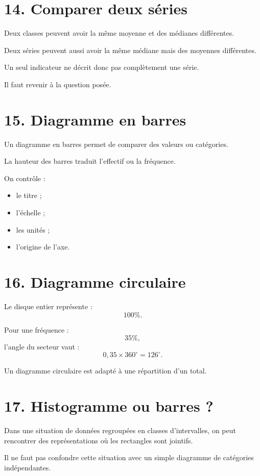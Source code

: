 \section{14. Comparer deux séries}

Deux classes peuvent avoir la même moyenne et des médianes différentes.

Deux séries peuvent aussi avoir la même médiane mais des moyennes différentes.

Un seul indicateur ne décrit donc pas complètement une série.

Il faut revenir à la question posée.

\section{15. Diagramme en barres}

Un diagramme en barres permet de comparer des valeurs ou catégories.

La hauteur des barres traduit l'effectif ou la fréquence.

On contrôle :
\begin{itemize}
\item le titre ;
\item l'échelle ;
\item les unités ;
\item l'origine de l'axe.
\end{itemize}

\section{16. Diagramme circulaire}

Le disque entier représente :
\[
100\%.
\]

Pour une fréquence :
\[
35\%,
\]
l'angle du secteur vaut :
\[
0{,}35\times360^\circ=126^\circ.
\]

Un diagramme circulaire est adapté à une répartition d'un total.

\section{17. Histogramme ou barres ?}

Dans une situation de données regroupées en classes d'intervalles, on peut rencontrer des représentations où les rectangles sont jointifs.

Il ne faut pas confondre cette situation avec un simple diagramme de catégories indépendantes.


